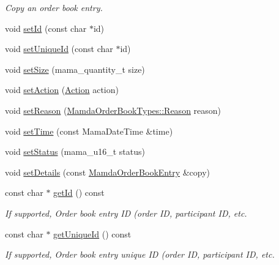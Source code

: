 \begin{CompactItemize}
\begin{CompactList}\small\item\em Copy an order book entry. \item\end{CompactList}\item 
void \hyperlink{classWombat_1_1MamdaOrderBookEntry_9625d949cdf4904dc40c98c937b738fc}{set\-Id} (const char $\ast$id)
\item 
void \hyperlink{classWombat_1_1MamdaOrderBookEntry_e3315def6ef4641b52b5fd1ec4581c11}{set\-Unique\-Id} (const char $\ast$id)
\item 
void \hyperlink{classWombat_1_1MamdaOrderBookEntry_0520962406e35793f0925845ff32791f}{set\-Size} (mama\_\-quantity\_\-t size)
\item 
void \hyperlink{classWombat_1_1MamdaOrderBookEntry_57ad02d4d138a273e6471e900fdf2c14}{set\-Action} (\hyperlink{classWombat_1_1MamdaOrderBookEntry_fc6cb1d67c7601d093a36f59cf9bcef4}{Action} action)
\item 
void \hyperlink{classWombat_1_1MamdaOrderBookEntry_0474d09c574c9fab3b2340c5d1aeff6d}{set\-Reason} (\hyperlink{classWombat_1_1MamdaOrderBookTypes_a1147c14315f68b9371c92a6a259fbd5}{Mamda\-Order\-Book\-Types::Reason} reason)
\item 
void \hyperlink{classWombat_1_1MamdaOrderBookEntry_10387ca9c9405ffcaa167ae9b93127ac}{set\-Time} (const Mama\-Date\-Time \&time)
\item 
void \hyperlink{classWombat_1_1MamdaOrderBookEntry_d54939cc5ed80ff7d4f282e0fa0f5aac}{set\-Status} (mama\_\-u16\_\-t status)
\item 
void \hyperlink{classWombat_1_1MamdaOrderBookEntry_a0ba36b1717312d26696ef172ed2dd8b}{set\-Details} (const \hyperlink{classWombat_1_1MamdaOrderBookEntry}{Mamda\-Order\-Book\-Entry} \&copy)
\item 
const char $\ast$ \hyperlink{classWombat_1_1MamdaOrderBookEntry_1c02f6be28f007199af0108f96c829c8}{get\-Id} () const 
\begin{CompactList}\small\item\em If supported, Order book entry ID (order ID, participant ID, etc. \item\end{CompactList}\item 
const char $\ast$ \hyperlink{classWombat_1_1MamdaOrderBookEntry_8957ccfa3dbebb3da96905becc584220}{get\-Unique\-Id} () const 
\begin{CompactList}\small\item\em If supported, Order book entry unique ID (order ID, participant ID, etc. \item\end{CompactList}\item 

\end{CompactItemize}
